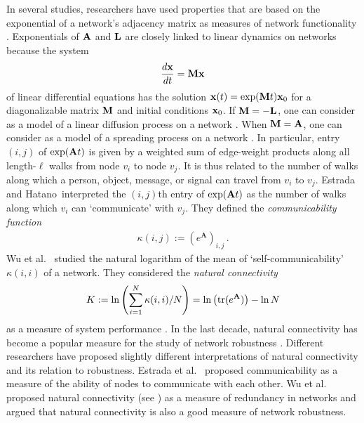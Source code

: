 \documentclass{comnet-mod}
\begin{document}
In several studies, researchers have used properties that are based on the exponential of a network's adjacency matrix as measures of network functionality \cite{Estrada2005, Estrada2008, Estrada2012a}. 
Exponentials of ${\bf A}$ and ${\bf L}$ are closely linked to linear dynamics on networks \cite{estrada2012review} because the system
\begin{align} \label{eq:linear_system}
	\frac{d{\bf x}}{dt} = {\bf M}{\bf x}
\end{align}
of linear differential equations has the solution ${\bf x}(t) = \exp({\bf M}t){\bf x}_0$ for a diagonalizable matrix ${\bf M}$ and initial conditions ${\bf x}_0$. If ${\bf M} = -{\bf L}$, one can consider  as a model of a linear diffusion process on a network \cite{Mirzaev2013}. When ${\bf M} = {\bf A}$, one can consider  as a model of a spreading process on a network \cite{Masuda2017}. 
In particular, entry $(i,j)$ of $\exp({\bf A}t)$ is given by a weighted sum of edge-weight products along all length-$\ell$ walks from node $v_i$ to node $v_j$. It is thus related to the number of walks along which a person, object, message, or signal can travel from $v_i$ to $v_j$. Estrada and Hatano~\cite{Estrada2008}interpreted the $(i,j)$th entry of $\exp({\bf A}t)$ as the number of walks along which $v_i$ can `communicate' with $v_j$. They defined the \textit{communicability function}
\begin{align}
	\kappa(i,j) := \left(e^{\mathbf A}\right)_{i,j}\,.\label{eq:commfunc}
\end{align}
Wu et al.~\cite{Wu2010} studied the natural logarithm of the mean of `self-communicability' $\kappa(i,i)$ of a network. They considered the \textit{natural connectivity}
\begin{align}
	K := \ln\left(\sum_{i=1}^N\kappa(i,i)/N\right) = \ln\left(\textrm{tr}(e^{\bf A})\right) - \ln N\nonumber
\end{align}
as a measure of system performance \cite{Wu2010}. In the last decade, natural connectivity has become a popular measure for the study of network robustness \cite{Wu2010, Wu2010a, Peng2016, Wang2018, Yamashita2019}. Different researchers have proposed slightly different interpretations of natural connectivity and its relation to robustness. Estrada et al.~\cite{Estrada2008} proposed communicability as a measure of the ability of nodes to communicate with each other. Wu et al.~\cite{Wu2010} proposed natural connectivity (see ) as a measure of redundancy in networks and argued that natural connectivity is also a good measure of network robustness. 
\end{document}
